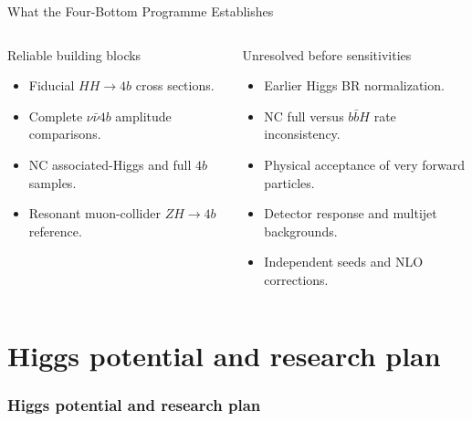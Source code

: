 \documentclass[aspectratio=1610,english]{beamer}
\newcommand{\src}[1]{\vfill{\par\color{black!65}\fontsize{6.4}{7.4}\selectfont\emph{Source:} #1\par}}
\newcommand{\key}[1]{\begin{alertblock}{Physics takeaway}\small  #1\end{alertblock}}
\begin{document}
\begin{frame}[t]{What the Four-Bottom Programme Establishes}
\small

\begin{columns}%
\begin{exampleblock}{Reliable building blocks}
\begin{itemize}
\justifying 
\item Fiducial $HH\to4b$ cross sections.
\item Complete $\nu\bar\nu4b$ amplitude comparisons.
\item NC associated-Higgs and full $4b$ samples.
\item Resonant muon-collider $ZH\to4b$ reference.
\end{itemize}\end{exampleblock}
\begin{alertblock}{Unresolved before sensitivities}
\begin{itemize}
\justifying
\item Earlier Higgs BR normalization.
\item NC full versus $b\bar bH$ rate inconsistency.
\item Physical acceptance of very forward particles.
\item Detector response and multijet backgrounds.
\item Independent seeds and NLO corrections.
\end{itemize}\end{alertblock}
\end{columns}


\end{frame}




\part{Higgs potential and research plan}
\section{Higgs potential and research plan}
\end{document}
